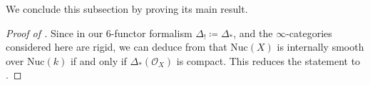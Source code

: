 \documentclass[oneside, hidelinks, 12pt, a4paper,reqno]{amsart}
\theoremstyle{plain}
\theoremstyle{definition}
\theoremstyle{plain}
\newcommand{\cates}{$\infty$-categories }
\newcommand{\Nuc}{\mathrm{Nuc}}
\begin{document}
We conclude this subsection by proving its main result.

\begin{proof}[Proof of ]
    Since in our $6$-functor formalism $\Delta_{!}\coloneqq\Delta_{\ast}$, and the \cates considered here are rigid, we can deduce from  that $\Nuc(X)$ is internally smooth over $\Nuc(k)$ if and only if $\Delta_\ast(\mathscr{O}_X)$ is compact. This reduces the statement to .
\end{proof}

\end{document}
